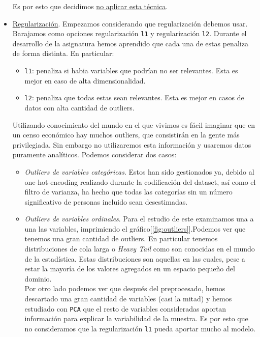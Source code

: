 \documentclass[11pt,a4paper]{article}
\begin{document}
\begin{itemize}
Es por esto que decidimos \underline{no aplicar esta técnica}.
\item \underline{Regularización}. Empezamos considerando que regularización debemos usar. Barajamos como opciones regularización \texttt{l1} y regularización \texttt{l2}. Durante el desarrollo de la asignatura hemos aprendido que cada una de estas penaliza de forma distinta. En particular:
  \begin{itemize}
  \item \texttt{l1}: penaliza si habia variables que podrían no ser relevantes. Esta es mejor en caso de alta dimensionalidad.
  \item \texttt{l2}: penaliza que todas estas sean relevantes. Esta es mejor en casos de datos con alta cantidad de outliers.
  \end{itemize}

  Utilizando conocimiento del mundo en el que vivimos es fácil imaginar que en un censo económico hay muchos outliers, que consistirán en la gente más privilegiada. Sin embargo no utilizaremos esta información y usaremos datos puramente analíticos. Podemos considerar dos casos:
  \begin{itemize}
  \item \emph{Outliers de variables categóricas}. Estos han sido gestionados ya, debido al one-hot-encoding realizado durante la codificación del dataset, así como el filtro de varianza, ha hecho que todas las categorías sin un número significativo de personas incluido sean desestimadas.
  \item \emph{Outliers de variables ordinales}. Para el estudio de este examinamos una a una las variables, imprimiendo el gráfico[\ref{fig:outliers}].Podemos ver que tenemos una gran cantidad de outliers. En particular tenemos distribuciones de cola larga o \emph{Heavy Tail} como son conocidas en el mundo de la estadística. Estas distribuciones son aquellas en las cuales, pese a estar la mayoría de los valores agregados en un espacio pequeño del dominio.\\

    Por otro lado podemos ver que después del preprocesado, hemos descartado una gran cantidad de variables (casi la mitad) y hemos estudiado con \texttt{PCA} que el resto de variables consideradas aportan información para explicar la variabilidad de la muestra. Es por esto que no consideramos que la regularización \texttt{l1} pueda aportar mucho al modelo.


\end{itemize}
\end{itemize}
\end{document}
